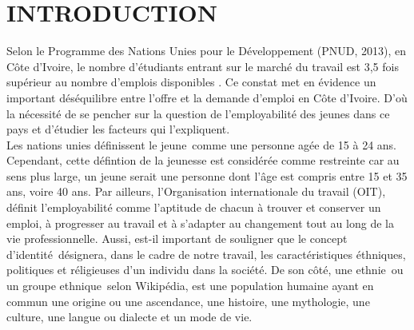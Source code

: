 \documentclass[12pt,a4paper, openany]{book}
\begin{document}
	
	\mainmatter
	
	\chapter{INTRODUCTION}  

\noindent Selon le Programme des Nations Unies pour le Développement (PNUD, 2013), en Côte d'Ivoire, le nombre d'étudiants entrant sur le marché du travail est 3,5 fois supérieur au nombre d'emplois disponibles \citep{franccoisuniversites}. Ce constat met en évidence un important déséquilibre entre l'offre et la demande d'emploi en Côte d'Ivoire. D'où la nécessité de se pencher sur la question de l'employabilité des jeunes dans ce pays et d'étudier les facteurs qui l'expliquent.\\

\noindent Les nations unies définissent le \guillemetleft jeune\guillemetright\ comme une personne agée de 15 à 24 ans. Cependant, cette défintion de la jeunesse est considérée comme restreinte car au sens plus large, un jeune serait une personne dont l'âge est compris entre 15 et 35 ans, voire 40 ans. Par ailleurs, l'Organisation internationale du travail (OIT), définit l'employabilité comme l'aptitude de chacun à trouver et conserver un emploi, à progresser au travail et à s'adapter au changement tout au long de la vie professionnelle. Aussi, est-il important de souligner que le concept d'\guillemetleft identité\guillemetright\ désignera, dans le cadre de notre travail, les caractéristiques éthniques, politiques et réligieuses d'un individu dans la société. De son côté, \guillemetleft une ethnie\guillemetright\ ou \guillemetleft un groupe ethnique\guillemetright\, selon Wikipédia, est une population humaine ayant en commun une origine ou une ascendance, une histoire, une mythologie, une culture, une langue ou dialecte et un mode de vie.\\
\end{document}
